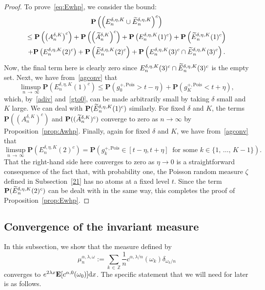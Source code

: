 \documentclass[10pt]{amsart}
\theoremstyle{definition}\newtheorem{defi}[theo]{Definition}\newtheorem{rema}[theo]{Remark}\newtheorem{exam}[theo]{Example}\newtheorem{exem}[theo]{Example}\newtheorem{nota}[theo]{Notation}
\newcommand{\Z}{\mathbb Z}
\newcommand{\bfP}{\mathbf{P}}
\newcommand{\bfE}{\mathbf{E}}
\newcommand{\dd}{\text{\upshape{d}}}
\newcommand{\Pois}{\text{Pois}}
\let\oldtilde\tilde
\renewcommand*{\tilde}[1]{\mathchoice{\widetilde{#1}}{\widetilde{#1}}{\oldtilde{#1}}{\oldtilde{#1}}}
\begin{document}
\begin{proof}
To prove~\eqref{eq:Ewhp}, we consider the bound:
\begin{multline*}
\bfP\left(\left({E}_n^{\delta,\eta,K}\cup \tilde{E}_n^{\delta,\eta,K}\right)^c\right)\\
\leq \bfP\left(\left({A}_n^{\delta,K}\right)^c\right) +\bfP\left(\left(\tilde{A}_n^{\delta,K}\right)^c\right) +\bfP\left({E}_n^{\delta,\eta,K}(1)^c\right) +\bfP\left(\tilde{E}_n^{\delta,\eta,K}(1)^c\right)\\
+\bfP\left({E}_n^{\delta,\eta,K}(2)^c\right) +\bfP\left(\tilde{E}_n^{\delta,\eta,K}(2)^c\right) +\bfP\left({E}_n^{\delta,\eta,K}(3)^c\cap\tilde{E}_n^{\delta,\eta,K}(3)^c\right).
\end{multline*}
Now, the final term here is clearly zero since ${E}_n^{\delta,\eta,K}(3)^c\cap\tilde{E}_n^{\delta,\eta,K}(3)^c$ is the empty set. Next, we have from~\eqref{agconv} that
\[
\limsup_{n\,\rightarrow\,\infty} \bfP\left({E}_n^{\delta,\eta,K}(1)^c\right)\leq\bfP\left(g_0^{+,\Pois}> t-\eta\right)+\bfP\left(g_K^{+,\Pois}< t+\eta\right),
\]
which, by~\eqref{adiv} and~\eqref{gto0}, can be made arbitrarily small by taking $\delta$ small and $K$ large. We can deal with $\bfP(\tilde{E}_n^{\delta,\eta,K}(1)^c)$ similarly. For fixed $\delta$ and $K$, the terms $\bfP(({A}_n^{\delta,K})^c)$ and $\bfP((\tilde{A}_n^{\delta,K})^c)$ converge to zero as $n\rightarrow\infty$ by Proposition~\ref{prop:Awhp}. Finally, again for fixed $\delta$ and $K$, we have from~\eqref{agconv} that
\[
\limsup_{n\,\rightarrow\,\infty} \bfP\left({E}_n^{\delta,\eta,K}(2)^c\right)=
\bfP\left(g_k^{+,\Pois}\in[t-\eta,t+\eta]\:\text{ for some }k\in\{1,\,\dots,\,K-1\}\right).
\]
That the right-hand side here converges to zero as $\eta\rightarrow 0$ is a straightforward consequence of the fact that, with probability one, the Poisson random measure $\zeta$ defined in Subsection~\ref{21} has no atoms at a fixed level $t$. Since the term $\bfP(\tilde{E}_n^{\delta,\eta,K}(2)^c)$ can be dealt with in the same way, this completes the proof of Proposition~\ref{prop:Ewhp}.
\end{proof}

\subsection{Convergence of the invariant measure}\label{23}

In this subsection, we show that the measure defined by
\begin{equation}\label{mundef}
\mu_n^{\alpha,\lambda,\omega}:=\sum_{k\,\in\,\Z}\frac{1}{n}c^{\alpha,\lambda/n}(\omega_k)\delta_{\omega_k/n}
\end{equation}
converges to $e^{2\lambda x}\bfE[c^{\alpha,0}(\omega_0)]\dd x$. The specific statement that we will need for later is as follows.
\end{document}
